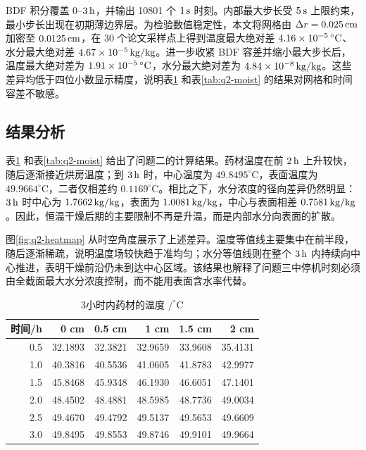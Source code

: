 \documentclass[UTF8,a4paper,12pt]{ctexart}
\numberwithin{equation}{section}
\begin{document}
BDF 积分覆盖 $0$--$3\rm\,h$，并输出 10801 个 $1\rm\,s$ 时刻。内部最大步长受 $5\rm\,s$ 上限约束，最小步长出现在初期薄边界层。为检验数值稳定性，本文将网格由 $\Delta r=0.025\rm\,cm$ 加密至 $0.0125\rm\,cm$，在 30 个论文采样点上得到温度最大绝对差 $4.16\times10^{-5}\rm\,{}^\circ\mathrm C$、水分最大绝对差 $4.67\times10^{-5}\rm\,kg/kg$。进一步收紧 BDF 容差并缩小最大步长后，温度最大绝对差为 $1.91\times10^{-5}\rm\,{}^\circ\mathrm C$，水分最大绝对差为 $4.84\times10^{-8}\rm\,kg/kg$。这些差异均低于四位小数显示精度，说明表\ref{tab:q2-temp} 和表\ref{tab:q2-moist} 的结果对网格和时间容差不敏感。

\subsection{结果分析}
表\ref{tab:q2-temp} 和表\ref{tab:q2-moist} 给出了问题二的计算结果。药材温度在前 $2\rm\,h$ 上升较快，随后逐渐接近烘房温度；到 $3\rm\,h$ 时，中心温度为 $49.8495^\circ\mathrm C$，表面温度为 $49.9664^\circ\mathrm C$，二者仅相差约 $0.1169^\circ\mathrm C$。相比之下，水分浓度的径向差异仍然明显：$3\rm\,h$ 时中心为 $1.7662\rm\,kg/kg$，表面为 $1.0081\rm\,kg/kg$，中心与表面相差 $0.7581\rm\,kg/kg$。因此，恒温干燥后期的主要限制不再是升温，而是内部水分向表面的扩散。

图\ref{fig:q2-heatmap} 从时空角度展示了上述差异。温度等值线主要集中在前半段，随后逐渐稀疏，说明温度场较快趋于准均匀；水分等值线则在整个 $3\rm\,h$ 内持续向中心推进，表明干燥前沿仍未到达中心区域。该结果也解释了问题三中停机时刻必须由全截面最大水分浓度控制，而不能用表面含水率代替。

\begin{table}[H]
  \centering
  \caption{3小时内药材的温度 $/^\circ\mathrm C$}
  \label{tab:q2-temp}
  \begin{tabular}{rrrrrr}
    \toprule
    时间/h & 0 cm & 0.5 cm & 1 cm & 1.5 cm & 2 cm\\ \midrule
    0.5 & 32.1893 & 32.3821 & 32.9659 & 33.9608 & 35.4131\\
    1.0 & 40.3816 & 40.5536 & 41.0605 & 41.8783 & 42.9977\\
    1.5 & 45.8468 & 45.9348 & 46.1930 & 46.6051 & 47.1401\\
    2.0 & 48.4502 & 48.4881 & 48.5985 & 48.7736 & 49.0034\\
    2.5 & 49.4670 & 49.4792 & 49.5137 & 49.5653 & 49.6609\\
    3.0 & 49.8495 & 49.8553 & 49.8746 & 49.9101 & 49.9664\\
    \bottomrule
  \end{tabular}
\end{table}
\end{document}
